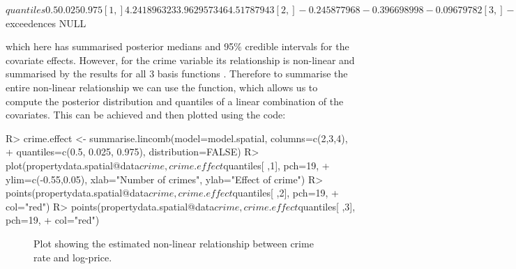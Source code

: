 \documentclass[article,shortnames,nojss]{jss}
\begin{document}
\begin{CodeOutput}
$quantiles
0.5        0.025       0.975
[1,]  4.241896323  3.962957346  4.51787943
[2,] -0.245877968 -0.396698998 -0.09679782
[3,] -0.401030811 -0.704894560 -0.10461861
[4,] -0.200704600 -0.407327946  0.01018534
[5,]  0.219841199  0.169342794  0.27108763
[6,]  0.002237906  0.001611683  0.00287336
[7,] -0.248767056 -0.368024984 -0.12990882
[8,] -0.162194165 -0.263154252 -0.06109645
[9,] -0.294254065 -0.422182354 -0.16841391
[10,] -0.005002887 -0.061142928  0.04995092

$exceedences
NULL
\end{CodeOutput}


which here has summarised posterior medians and 95$\%$ credible intervals for the covariate effects. However, for the crime variable its relationship is non-linear and summarised by the results for all 3 basis functions . Therefore to summarise the entire non-linear relationship we can use the  function, which allows us to compute the posterior distribution and quantiles of a linear combination of the covariates. This can be achieved and then plotted using the code:


\begin{CodeInput}
R> crime.effect <- summarise.lincomb(model=model.spatial, columns=c(2,3,4), 
+    quantiles=c(0.5, 0.025, 0.975), distribution=FALSE)
R> plot(propertydata.spatial@data$crime, crime.effect$quantiles[ ,1], pch=19, 
+    ylim=c(-0.55,0.05), xlab="Number of crimes", ylab="Effect of crime")
R> points(propertydata.spatial@data$crime, crime.effect$quantiles[ ,2], pch=19, 
+   col="red")
R> points(propertydata.spatial@data$crime, crime.effect$quantiles[ ,3], pch=19, 
+   col="red")
\end{CodeInput}


\begin{figure}
\centering 
{}
\caption{Plot showing the estimated non-linear relationship between crime rate and log-price.\label{crimeplot}}
\end{figure} 
\end{document}
